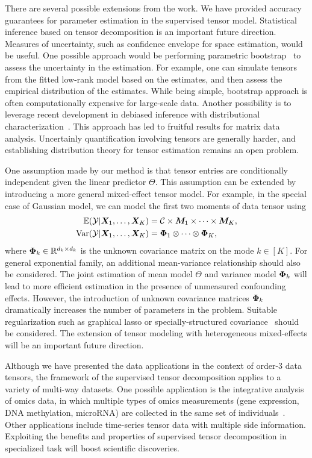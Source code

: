 \documentclass[12pt]{article}
\theoremstyle{definition}
\theoremstyle{definition}
\begin{document}
There are several possible extensions from the work. We have provided accuracy guarantees for parameter estimation in the supervised tensor model. Statistical inference based on tensor decomposition is an important future direction. Measures of uncertainty, such as confidence envelope for space estimation, would be useful. One possible approach would be performing parametric bootstrap~\citep{efron1994introduction} to assess the uncertainty in the estimation. 
For example, one can simulate tensors from the fitted low-rank model based on the estimates, and then assess the empirical distribution of the estimates. 
While being simple, bootstrap approach is often computationally expensive for large-scale data. Another possibility is to leverage recent development in debiased inference with distributional characterization~\citep{chen2019inference}. This approach has led to fruitful results for matrix data analysis. Uncertainly quantification involving tensors are generally harder, and establishing distribution theory for tensor estimation remains an open problem.

One assumption made by our method is that tensor entries are conditionally independent given the linear predictor $\Theta$. This assumption can be extended by introducing a more general mixed-effect tensor model. For example, in the special case of Gaussian model, we can model the first two moments of data tensor using
\begin{align}\label{eq:extention}
\mathbb{E}(\mathcal{Y}|\bm X_1,\ldots,\bm X_K)&=\mathcal{C}\times\bm M_1\times \cdots \times \bm M_K,\\
 \text{Var}(\mathcal{Y}|\bm X_1,\ldots,\bm X_K)&=\bm{\Phi}_1\otimes \cdots \otimes \bm{\Phi}_K,
\end{align}
where $\bm{\Phi}_k\in\mathbb{R}^{d_k\times d_k}$ is the unknown covariance matrix on the mode $k\in[K]$. For general exponential family, an additional mean-variance relationship should also be considered. The joint estimation of mean model $\Theta$ and variance model $\bm{\Phi}_k$ will lead to more efficient estimation in the presence of unmeasured confounding effects. However, the introduction of unknown covariance matrices $\bm{\Phi}_k$ dramatically increases the number of parameters in the problem. {\color{blue}Suitable regularization such as graphical lasso or specially-structured covariance~\citep{li2017parsimonious,lock2018supervised} should be considered.} The extension of tensor modeling with heterogeneous mixed-effects will be an important future direction. 

Although we have presented the data applications in the context of order-3 data tensors, the framework of the supervised tensor decomposition applies to a variety of multi-way datasets. One possible application is the integrative analysis of omics data, in which multiple types of omics measurements (gene expression, DNA methylation, microRNA) are collected in the same set of individuals~\citep{lock2013joint,wang2019three}. Other applications include time-series tensor data with multiple side information. Exploiting the benefits and properties of  supervised tensor decomposition in specialized task will boost scientific discoveries.
\end{document}
